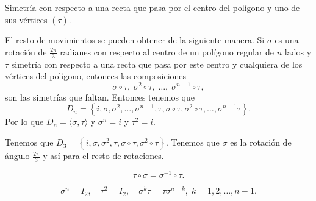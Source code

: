 \begin{eg}
\normalfont Simetría con respecto a una recta que pasa por el centro del polígono y uno de sus vértices $\displaystyle \left(\tau\right) $.
\end{eg}

El resto de movimientos se pueden obtener de la siguiente manera. Si $\displaystyle \sigma  $ es una rotación de $\displaystyle \frac{2\pi }{3} $ radianes con respecto al centro de un polígono regular de $\displaystyle n $  lados y $\displaystyle \tau $ simetría con respecto a una recta que pasa por este centro y cualquiera de los vértices del polígono, entonces las composiciones 
\[\sigma \circ \tau, \; \sigma ^{2} \circ \tau , \; \ldots, \; \sigma^{n-1}\circ \tau ,\]
son las simetrías que faltan.
Entonces tenemos que 
\[D_{n} = \left\{ i, \sigma, \sigma^{2}, \ldots, \sigma^{n-1}, \tau, \sigma\circ\tau, \sigma^{2}\circ \tau , \ldots, \sigma ^{n-1}\tau\right\}  .\]
Por lo que $\displaystyle D_{n} = \langle \sigma, \tau \rangle  $ y $\displaystyle \sigma^{n} = i $ y $\displaystyle \tau^{2} = i $.
\begin{eg}
	\normalfont Tenemos que $\displaystyle D_{3} = \left\{ i, \sigma, \sigma^{2},\tau, \sigma\circ\tau, \sigma^{2}\circ\tau\right\}  $. Tenemos que $\displaystyle \sigma  $ es la rotación de ángulo $\displaystyle \frac{2\pi }{3} $ y así para el resto de rotaciones.
\end{eg}

\begin{fprop}[]
\normalfont 
\[\tau \circ \sigma = \sigma ^{-1}\circ \tau .\]
\end{fprop}

\begin{fprop}[]
\normalfont 
\[ \sigma^{n} = I_{2}, \quad \tau^{2} = I_{2}, \quad \sigma^{k}\tau=\tau\sigma^{n-k}, \; k = 1, 2, \ldots, n-1 .\]
\end{fprop}

